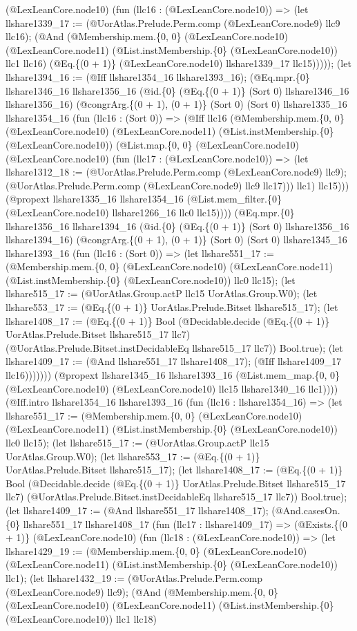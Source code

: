 \documentclass[11pt]{article}
\begin{document}
(@LexLeanCore.node10) (fun (llc16 : (@LexLeanCore.node10)) => (let llshare1339\_17 := (@UorAtlas.Prelude.Perm.comp (@LexLeanCore.node9) llc9 llc16); (@And (@Membership.mem.\{0, 0\} (@LexLeanCore.node10) (@LexLeanCore.node11) (@List.instMembership.\{0\} (@LexLeanCore.node10)) llc1 llc16) (@Eq.\{(0 + 1)\} (@LexLeanCore.node10) llshare1339\_17 llc15))))); (let llshare1394\_16 := (@Iff llshare1354\_16 llshare1393\_16); (@Eq.mpr.\{0\} llshare1346\_16 llshare1356\_16 (@id.\{0\} (@Eq.\{(0 + 1)\} (Sort 0) llshare1346\_16 llshare1356\_16) (@congrArg.\{(0 + 1), (0 + 1)\} (Sort 0) (Sort 0) llshare1335\_16 llshare1354\_16 (fun (llc16 : (Sort 0)) => (@Iff llc16 (@Membership.mem.\{0, 0\} (@LexLeanCore.node10) (@LexLeanCore.node11) (@List.instMembership.\{0\} (@LexLeanCore.node10)) (@List.map.\{0, 0\} (@LexLeanCore.node10) (@LexLeanCore.node10) (fun (llc17 : (@LexLeanCore.node10)) => (let llshare1312\_18 := (@UorAtlas.Prelude.Perm.comp (@LexLeanCore.node9) llc9); (@UorAtlas.Prelude.Perm.comp (@LexLeanCore.node9) llc9 llc17))) llc1) llc15))) (@propext llshare1335\_16 llshare1354\_16 (@List.mem\_filter.\{0\} (@LexLeanCore.node10) llshare1266\_16 llc0 llc15)))) (@Eq.mpr.\{0\} llshare1356\_16 llshare1394\_16 (@id.\{0\} (@Eq.\{(0 + 1)\} (Sort 0) llshare1356\_16 llshare1394\_16) (@congrArg.\{(0 + 1), (0 + 1)\} (Sort 0) (Sort 0) llshare1345\_16 llshare1393\_16 (fun (llc16 : (Sort 0)) => (let llshare551\_17 := (@Membership.mem.\{0, 0\} (@LexLeanCore.node10) (@LexLeanCore.node11) (@List.instMembership.\{0\} (@LexLeanCore.node10)) llc0 llc15); (let llshare515\_17 := (@UorAtlas.Group.actP llc15 UorAtlas.Group.W0); (let llshare553\_17 := (@Eq.\{(0 + 1)\} UorAtlas.Prelude.Bitset llshare515\_17); (let llshare1408\_17 := (@Eq.\{(0 + 1)\} Bool (@Decidable.decide (@Eq.\{(0 + 1)\} UorAtlas.Prelude.Bitset llshare515\_17 llc7) (@UorAtlas.Prelude.Bitset.instDecidableEq llshare515\_17 llc7)) Bool.true); (let llshare1409\_17 := (@And llshare551\_17 llshare1408\_17); (@Iff llshare1409\_17 llc16))))))) (@propext llshare1345\_16 llshare1393\_16 (@List.mem\_map.\{0, 0\} (@LexLeanCore.node10) (@LexLeanCore.node10) llc15 llshare1340\_16 llc1)))) (@Iff.intro llshare1354\_16 llshare1393\_16 (fun (llc16 : llshare1354\_16) => (let llshare551\_17 := (@Membership.mem.\{0, 0\} (@LexLeanCore.node10) (@LexLeanCore.node11) (@List.instMembership.\{0\} (@LexLeanCore.node10)) llc0 llc15); (let llshare515\_17 := (@UorAtlas.Group.actP llc15 UorAtlas.Group.W0); (let llshare553\_17 := (@Eq.\{(0 + 1)\} UorAtlas.Prelude.Bitset llshare515\_17); (let llshare1408\_17 := (@Eq.\{(0 + 1)\} Bool (@Decidable.decide (@Eq.\{(0 + 1)\} UorAtlas.Prelude.Bitset llshare515\_17 llc7) (@UorAtlas.Prelude.Bitset.instDecidableEq llshare515\_17 llc7)) Bool.true); (let llshare1409\_17 := (@And llshare551\_17 llshare1408\_17); (@And.casesOn.\{0\} llshare551\_17 llshare1408\_17 (fun (llc17 : llshare1409\_17) => (@Exists.\{(0 + 1)\} (@LexLeanCore.node10) (fun (llc18 : (@LexLeanCore.node10)) => (let llshare1429\_19 := (@Membership.mem.\{0, 0\} (@LexLeanCore.node10) (@LexLeanCore.node11) (@List.instMembership.\{0\} (@LexLeanCore.node10)) llc1); (let llshare1432\_19 := (@UorAtlas.Prelude.Perm.comp (@LexLeanCore.node9) llc9); (@And (@Membership.mem.\{0, 0\} (@LexLeanCore.node10) (@LexLeanCore.node11) (@List.instMembership.\{0\} (@LexLeanCore.node10)) llc1 llc18) 
\end{document}
